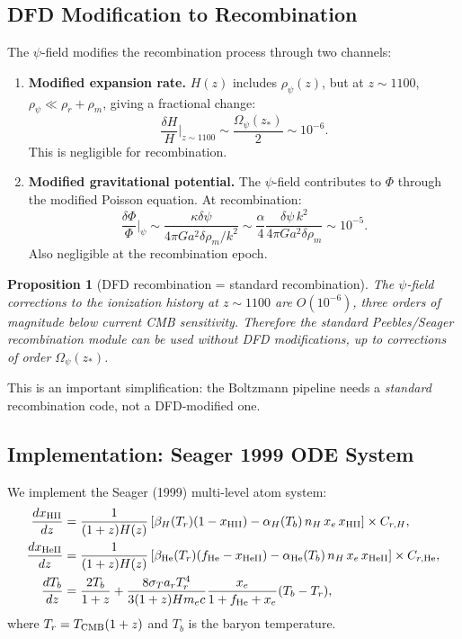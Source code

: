 \documentclass[11pt,a4paper]{article}
\newtheorem{proposition}[theorem]{Proposition}
\theoremstyle{remark}
\begin{document}
\subsection{DFD Modification to Recombination}

The $\psi$-field modifies the recombination process through two channels:

\begin{enumerate}
\item \textbf{Modified expansion rate.} $H(z)$ includes $\rho_\psi(z)$,
  but at $z \sim 1100$, $\rho_\psi \ll \rho_{r} + \rho_m$, giving a
  fractional change:
  \begin{equation}
  \frac{\delta H}{H}\bigg|_{z \sim 1100} \sim \frac{\Omega_\psi(z_{*})}
  {2} \sim 10^{-6}.
  \end{equation}
  This is negligible for recombination.

\item \textbf{Modified gravitational potential.} The $\psi$-field contributes
  to $\Phi$ through the modified Poisson equation. At recombination:
  \begin{equation}
  \frac{\delta\Phi}{\Phi}\bigg|_\psi \sim \frac{\kappa\delta\psi}
  {4\pi G a^2 \delta\rho_m / k^2} \sim \frac{\alpha}{4}
  \frac{\delta\psi\,k^2}{4\pi G a^2\delta\rho_m} \sim 10^{-5}.
  \end{equation}
  Also negligible at the recombination epoch.
\end{enumerate}

\begin{proposition}[DFD recombination = standard recombination]
\label{prop:recomb-standard}
The $\psi$-field corrections to the ionization history at $z \sim 1100$
are $O(10^{-6})$, three orders of magnitude below current CMB sensitivity.
Therefore the standard Peebles/Seager recombination module can be used
without DFD modifications, up to corrections of order $\Omega_\psi(z_*)$.
\end{proposition}

This is an important simplification: the Boltzmann pipeline needs a
\emph{standard} recombination code, not a DFD-modified one.

\subsection{Implementation: Seager 1999 ODE System}

We implement the Seager (1999) multi-level atom system:
\begin{align}
\frac{dx_{\rm HII}}{dz} &= \frac{1}{(1+z)H(z)}\left[
  \beta_H(T_r)(1 - x_{\rm HII}) - \alpha_H(T_b)\,n_H\,x_e\,x_{\rm HII}\right]
  \times C_{r,H}, \\
\frac{dx_{\rm HeII}}{dz} &= \frac{1}{(1+z)H(z)}\left[
  \beta_{\rm He}(T_r)(f_{\rm He} - x_{\rm HeII}) - \alpha_{\rm He}(T_b)\,n_H\,x_e\,x_{\rm HeII}\right]
  \times C_{r,{\rm He}}, \\
\frac{dT_b}{dz} &= \frac{2T_b}{1+z} + \frac{8\sigma_T a_r T_r^4}{3(1+z)H m_e c}
  \frac{x_e}{1 + f_{\rm He} + x_e}(T_b - T_r),
\end{align}
where $T_r = T_{\rm CMB}(1+z)$ and $T_b$ is the baryon temperature.
\end{document}

